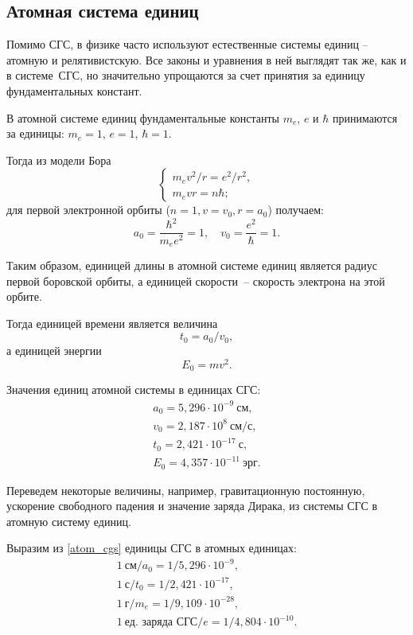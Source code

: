   \subsection{Атомная система единиц}

  Помимо СГС, в физике часто используют естественные системы единиц -- атомную и
  релятивистскую. Все законы и уравнения в ней выглядят так же, как и в
  системе~СГС, но значительно упрощаются за счет принятия за единицу
  фундаментальных констант.

  В атомной системе единиц фундаментальные константы \( m_e \), \( e \) и
  \( \hbar \) принимаются за единицы: \( m_e = 1 \), \( e = 1 \),
  \( \hbar = 1 \).

  Тогда из модели Бора
  \begin{equation}
    \left\{
      \begin{array}{l}
        m_e v^2 / r = e^2 / r^2, \\
        m_e vr = n\hbar;
      \end{array}
    \right.
    \label{Bohr_model}
  \end{equation}
  для первой электронной орбиты (\( n = 1, v = v_0, r = a_0 \)) получаем:
  \[
    a_0 = \frac{\hbar^2}{m_e e^2} = 1, \quad
      v_0 = \frac{e^2}{\hbar} = 1.
  \]

  Таким образом, единицей длины в атомной системе единиц является радиус первой
  боровской орбиты, а единицей скорости~-- скорость электрона на этой орбите.

  Тогда единицей времени является величина
  \[
    t_0 = a_0 / v_0,
  \]
  а единицей энергии
  \[
    E_0 = mv^2.
  \]

  Значения единиц атомной системы в единицах СГС:
  \begin{equation}
    \begin{array}{c}
      a_0 = 5,\!296 \cdot 10^{-9}~\text{см},\\
      v_0 = 2,\!187 \cdot 10^8~\text{см}/\text{с}, \\
      t_0 = 2,\!421 \cdot 10^{-17}~\text{с}, \\
      E_0 = 4,\!357 \cdot 10^{-11}~\text{эрг}.
    \end{array}
    \label{atom_cgs}
  \end{equation}

  Переведем некоторые величины, например, гравитационную постоянную, ускорение
  свободного падения и значение заряда Дирака, из системы СГС в атомную систему
  единиц.

  Выразим из \eqref{atom_cgs} единицы СГС в атомных единицах:
  \begin{gather*}
    1~\text{см} / a_0 = 1 / 5,\!296 \cdot 10^{-9}, \\
    1~\text{с} / t_0 = 1 / 2,\!421 \cdot 10^{-17}, \\
    1~\text{г} / m_e = 1 / 9,\!109 \cdot 10^{-28}, \\
    1~\text{ед.~заряда~СГС} / e = 1 / 4,\!804 \cdot 10^{-10}.
  \end{gather*}

